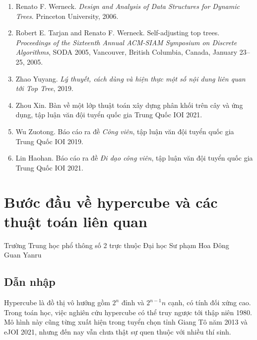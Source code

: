 \documentclass[11pt]{article}
\begin{document}
\begin{enumerate}
  \item Renato F. Werneck. \emph{Design and Analysis of Data Structures for
  Dynamic Trees}. Princeton University, 2006.
  \item Robert E. Tarjan and Renato F. Werneck. Self-adjusting top trees.
  \emph{Proceedings of the Sixteenth Annual ACM-SIAM Symposium on Discrete
  Algorithms}, SODA 2005, Vancouver, British Columbia, Canada, January 23--25,
  2005.
  \item Zhao Yuyang. \emph{Lý thuyết, cách dùng và hiện thực một số nội dung
  liên quan tới Top Tree}, 2019.
  \item Zhou Xin. Bàn về một lớp thuật toán xây dựng phân khối trên cây và ứng
  dụng, tập luận văn đội tuyển quốc gia Trung Quốc IOI 2021.
  \item Wu Zuotong. Báo cáo ra đề \emph{Công viên}, tập luận văn đội tuyển quốc
  gia Trung Quốc IOI 2019.
  \item Lin Haohan. Báo cáo ra đề \emph{Đi dạo công viên}, tập luận văn đội
  tuyển quốc gia Trung Quốc IOI 2021.
\end{enumerate}

\section{Bước đầu về hypercube và các thuật toán liên quan}

\begin{center}
Trường Trung học phổ thông số 2 trực thuộc Đại học Sư phạm Hoa Đông\\
Guan Yanru
\end{center}

\renewcommand{\abstractname}{Tóm tắt}
\begin{abstract}
Hypercube là một loại đồ thị vô hướng đặc biệt, có định nghĩa ngắn gọn và cấu
trúc đẹp. Bài viết hệ thống nhiều cách định nghĩa và các tính chất của
hypercube, khảo sát những thuật toán có bản chất liên quan tới hypercube, và
thảo luận các ví dụ, mô hình gần gũi với thi tin học. Tác giả hy vọng bài viết
gợi mở để người đọc tiếp tục học và nghiên cứu các bài toán trên hypercube.
\end{abstract}

\subsection{Dẫn nhập}

Hypercube là đồ thị vô hướng gồm \(2^n\) đỉnh và \(2^{n-1}n\) cạnh, có tính đối
xứng cao. Trong toán học, việc nghiên cứu hypercube có thể truy ngược tới thập
niên 1980. Mô hình này cũng từng xuất hiện trong tuyển chọn tỉnh Giang Tô năm
2013 và eJOI 2021, nhưng đến nay vẫn chưa thật sự quen thuộc với nhiều thí
sinh.
\end{document}
